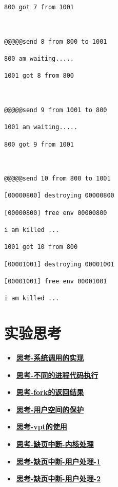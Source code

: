 \begin{verbatim}
800 got 7 from 1001



@@@@@send 8 from 800 to 1001

800 am waiting.....

1001 got 8 from 800



@@@@@send 9 from 1001 to 800

1001 am waiting.....

800 got 9 from 1001



@@@@@send 10 from 800 to 1001

[00000800] destroying 00000800

[00000800] free env 00000800

i am killed ...

1001 got 10 from 800

[00001001] destroying 00001001

[00001001] free env 00001001

i am killed ...

\end{verbatim}

\section{实验思考}

\begin{itemize}
	\item \hyperref[think-syscall]{\textbf{\textcolor{baseB}{思考-系统调用的实现}}}
	\item \hyperref[think-father-son]{\textbf{\textcolor{baseB}{思考-不同的进程代码执行}}}
	\item \hyperref[think-fork的调用]{\textbf{\textcolor{baseB}{思考-fork的返回结果}}}
	\item \hyperref[think:遍历页]{\textbf{\textcolor{baseB}{思考-用户空间的保护}}}
	\item \hyperref[think:vpt的使用]{\textbf{\textcolor{baseB}{思考-vpt的使用}}}
	\item \hyperref[think:pgfault-kernel]{\textbf{\textcolor{baseB}{思考-缺页中断-内核处理}}}
	\item \hyperref[think:pgfault-user-1]{\textbf{\textcolor{baseB}{思考-缺页中断-用户处理-1}}}
	\item \hyperref[think:pgfault-user-2]{\textbf{\textcolor{baseB}{思考-缺页中断-用户处理-2}}}
	
	
\end{itemize}

